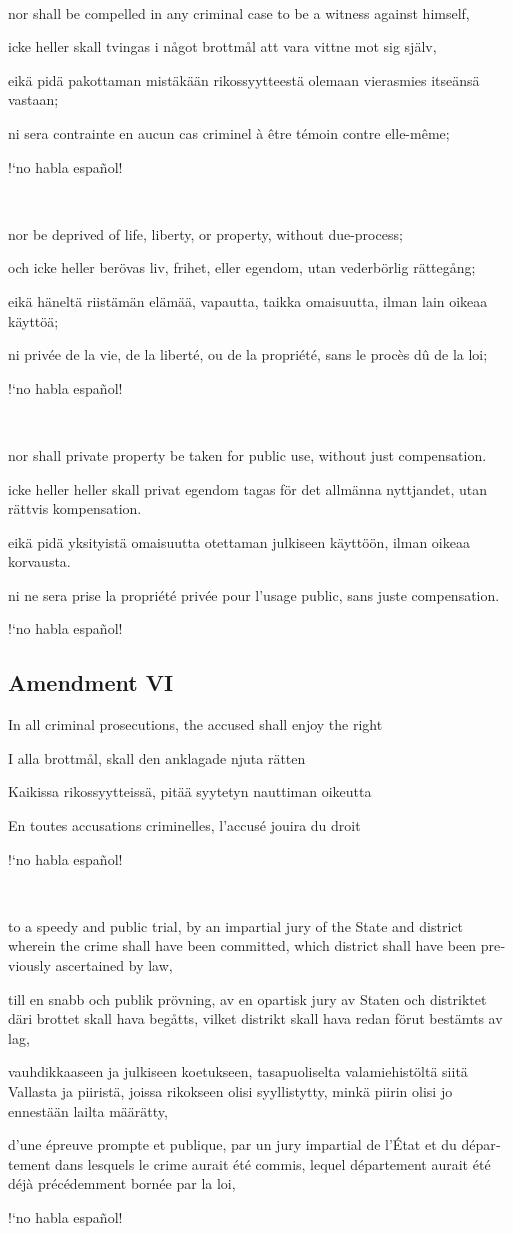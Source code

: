 \documentclass[a4paper,landscape,10pt]{article}
\newcommand{\tblock}[5]{\noindent\begin{minipage}[t]{0.18\textwidth}\foreignlanguage{english}{#1}\end{minipage}\hskip 0.025\textwidth\begin{minipage}[t]{0.18\textwidth}\foreignlanguage{swedish}{#2}\end{minipage}\hskip 0.025\textwidth\begin{minipage}[t]{0.18\textwidth}\foreignlanguage{finnish}{#3}\end{minipage}\hskip 0.025\textwidth\begin{minipage}[t]{0.18\textwidth}\foreignlanguage{french}{#4}\end{minipage}\hskip 0.025\textwidth\begin{minipage}[t]{0.18\textwidth}\foreignlanguage{spanish}{#5}\end{minipage}}
\begin{document}
~

\tblock
{nor shall be compelled in any criminal case to be a \gls{witness} against himself,}
{icke heller skall tvingas i något brottmål att vara vittne mot sig själv,}
{eikä pidä pakottaman mistäkään rikossyytteestä olemaan vierasmies itseänsä vastaan;}
{ni sera contrainte en aucun cas criminel à être témoin contre elle-même;}
{!`no habla español!}

~

\tblock
{nor be deprived of life, liberty, or property, without \gls{due-process};}
{och icke heller berövas liv, frihet, eller egendom, utan vederbörlig rättegång;}
{eikä häneltä riistämän elämää, vapautta, taikka omaisuutta, ilman lain oikeaa käyttöä;}
{ni privée de la vie, de la liberté, ou de la propriété, sans le procès dû de la loi;}
{!`no habla español!}

~

\tblock
{nor shall private property be taken for public use, without just compensation.}
{icke heller heller skall privat egendom tagas för det allmänna nyttjandet, utan rättvis kompensation.}
{eikä pidä yksityistä omaisuutta otettaman julkiseen käyttöön, ilman oikeaa korvausta.}
{ni ne sera prise la propriété privée pour l'usage public, sans juste compensation.}
{!`no habla español!}


\subsection*{Amendment VI}
\tblock
{In all criminal prosecutions, the accused shall enjoy the right}
{I alla brottmål, skall den anklagade njuta rätten}
{Kaikissa rikossyytteissä, pitää syytetyn nauttiman oikeutta}
{En toutes accusations criminelles, l'accusé jouira du droit}
{!`no habla español!}

~

\tblock
{to a speedy and public trial, by an impartial jury of the State and district wherein the crime shall have been committed, which district shall have been previously ascertained by law,}
{till en snabb och publik prövning, av en opartisk jury av Staten och distriktet däri brottet skall hava begåtts, vilket distrikt skall hava redan förut bestämts av lag,}
{vauhdikkaaseen ja julkiseen koetukseen, tasapuoliselta valamiehistöltä siitä Vallasta ja piiristä, joissa rikokseen olisi syyllistytty, minkä piirin olisi jo ennestään lailta määrätty,}
{d'une épreuve prompte et publique, par un jury impartial de l'État et du département dans lesquels le crime aurait été commis, lequel département aurait été déjà précédemment bornée par la loi,}
{!`no habla español!}
\end{document}
